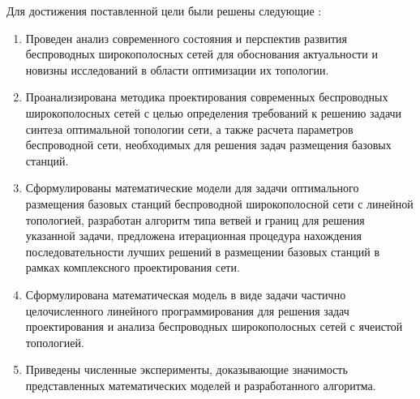 Для достижения поставленной цели были решены следующие {\tasks}:
\begin{enumerate}[beginpenalty=10000] %
  \item Проведен анализ современного состояния и перспектив развития беспроводных широкополосных сетей для обоснования  актуальности и новизны исследований в области оптимизации их топологии. 
  \item Проанализирована методика проектирования современных беспроводных широкополосных сетей с целью определения требований к решению задачи синтеза оптимальной топологии сети, а также расчета параметров беспроводной сети, необходимых для решения задач размещения базовых станций.
  \item Сформулированы математические модели для задачи оптимального размещения базовых станций беспроводной широкополосной сети с линейной топологией, разработан алгоритм типа ветвей и границ для решения указанной задачи, предложена итерационная процедура нахождения последовательности лучших решений в размещении базовых станций в рамках комплексного проектирования сети.
  \item Сформулирована математическая модель в виде задачи частично целочисленного линейного программирования для решения задач проектирования и анализа беспроводных широкополосных сетей с ячеистой топологией.
  \item Приведены численные эксперименты, доказывающие значимость представленных математических моделей и разработанного алгоритма.

\end{enumerate}

 

